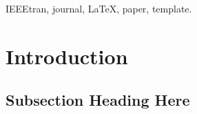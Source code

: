 \documentclass[journal]{IEEEtran}
\begin{document}







    \maketitle


    \begin{abstract}
        \blindtext[1]
    \end{abstract}

    \begin{IEEEkeywords}
        IEEEtran, journal, \LaTeX, paper, template.
    \end{IEEEkeywords}






    \IEEEpeerreviewmaketitle



    \section{Introduction}
    \blindtext

    \subsection{Subsection Heading Here}
    \blindtext
\end{document}
